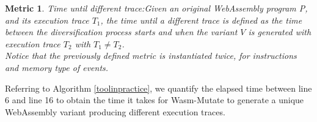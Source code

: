 \documentclass[a4paper,fleqn]{cas-dc}
\newcommand{\tool}{{\sc Wasm-Mutate}\xspace}
\newcommand{\Wasm}{WebAssembly\xspace}
\newcommand{\wasm}{\Wasm}
\newtheorem{metric}{Metric}
\begin{document}
\begin{metric}{Time until different trace:}\label{metric:mem:sha}
Given an original \wasm program P, and its execution trace $T_1$, the time until a different trace is defined as the time between the diversification process starts and when the variant $V$ is generated with execution trace $T_2$ with $T_1 \neq T_2$.
\\

Notice that the previously defined metric is instantiated twice, for instructions and memory type of events.

\end{metric}

Referring to Algorithm \ref{toolinpractice}, we quantify the elapsed time between line 6 and line 16 to obtain the time it takes for \tool to generate a unique \Wasm variant producing different execution traces.
\end{document}
